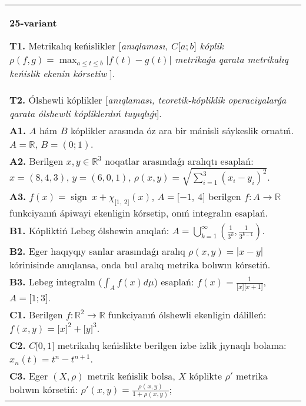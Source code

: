 \documentclass{article}
\DeclareMathOperator{\sign}{sign}
\begin{document}
\begin{tabular}{m{17cm}}
\textbf{25-variant}
\newline

\textbf{T1.} Metrikalıq keńislikler [\textit{anıqlaması, \(C\lbrack a;b\rbrack\) kóplik \(\rho(f,g) = \max_{a \leq t \leq b}\left| f(t) - g(t) \right|\) metrikaǵa qarata metrikalıq keńislik ekenin kórsetiw }]. \\
\textbf{T2.} Ólshewli kóplikler [\textit{anıqlaması, teoretik-kópliklik operaciyalarǵa qarata ólshewli kópliklerdıń tuyıqlıǵı}]. \\
\textbf{A1.} \(A\) hám \(B\) kóplikler arasında óz ara bir mánisli sáykeslik ornatıń. \(A\mathbb{= R}\), \(B = (0;1)\). \\
\textbf{A2.} Berilgen \(x,y \in \mathbb{R}^{3}\) noqatlar arasındaǵı aralıqtı esaplań: \(x = (8,4,3)\), \(y = (6,0,1)\), \(\rho(x,y) = \sqrt{{\sum_{i = 1}^{3}\left( x_{i} - y_{i} \right)^{2}}}\). \\
\textbf{A3.} \(f(x) = \sign \ x + \chi_{\lbrack 1,\ 2\rbrack}(x)\), \(A = \lbrack - 1,\ 4\rbrack\) berilgen \(f:A\rightarrow\mathbb{R}\) funkciyanıń ápiwayi ekenligin kórsetip, onıń integralın esaplań. \\
\textbf{B1.} Kópliktiń Lebeg ólshewin anıqlań: \(A = \bigcup_{k = 1}^{\infty}\left( \frac{1}{3^{k}},\frac{1}{3^{k - 1}} \right)\). \\
\textbf{B2.} Eger haqıyqıy sanlar arasındaǵı aralıq \(\rho(x,y) = |x - y|\) kórinisinde anıqlansa, onda bul aralıq metrika bolıwın kórsetiń. \\
\textbf{B3.} Lebeg integralın (\(\int_{A}^{}{f(x)d\mu}\)) esaplań: \(f(x) = \frac{1}{\lbrack x\rbrack\lbrack x + 1\rbrack}\), \(A = \lbrack 1;3\rbrack\). \\
\textbf{C1.} Berilgen \(f:\mathbb{R}^{2}\mathbb{\rightarrow R}\) funkciyanıń ólshewli ekenligin dálilleń: \(f(x,y) = \lbrack x\rbrack^{2} + \lbrack y\rbrack^{3}\). \\
\textbf{C2.} \(C\lbrack 0,1\rbrack\) metrikalıq keńislikte berilgen izbe izlik jıynaqlı bolama: \(x_{n}(t) = t^{n} - t^{n + 1}\). \\
\textbf{C3.} Eger \((X,\rho)\) metrik keńislik bolsa, \(X\) kóplikte \(\rho'\) metrika bolıwın kórsetiń: \(\rho'(x,y) = \frac{\rho(x,y)}{1 + \rho(x,y)}\); \\

\end{tabular}
\vspace{1cm}
\end{document}
